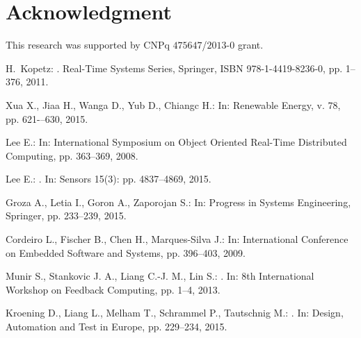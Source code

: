 \documentclass{acm_sen_article}
\begin{document}


\section*{Acknowledgment}

This research was supported by CNPq $475647$/$2013$-$0$ grant.



\begin{thebibliography}{1}

H.~Kopetz:
.
\newblock Real-Time Systems Series, Springer, ISBN 978-1-4419-8236-0, pp. 1--376, 2011.

Xua X., Jiaa H., Wanga D., Yub D., Chiangc H.:
\newblock In: Renewable Energy, v. 78, pp. 621-–630, 2015.

Lee E.:
\newblock In: International Symposium on Object Oriented Real-Time Distributed Computing, pp. 363--369, 2008.

Lee E.:
. 
\newblock In: Sensors 15(3): pp. 4837--4869, 2015.

Groza A., Letia I., Goron A., Zaporojan S.: 
\newblock In: Progress in Systems Engineering, Springer, pp. 233--239, 2015.

Cordeiro L., Fischer B., Chen H., Marques-Silva J.:
\newblock In: International Conference on Embedded Software and Systems, pp. 396--403, 2009.

Munir  S., Stankovic J. A., Liang C.-J. M., Lin S.:
. 
\newblock In: 8th International Workshop on Feedback Computing, pp. 1--4, 2013.

Kroening D., Liang L., Melham T., Schrammel P., Tautschnig M.:
. 
\newblock In: Design, Automation and Test in Europe, pp. 229--234, 2015.


\end{thebibliography}
\end{document}
